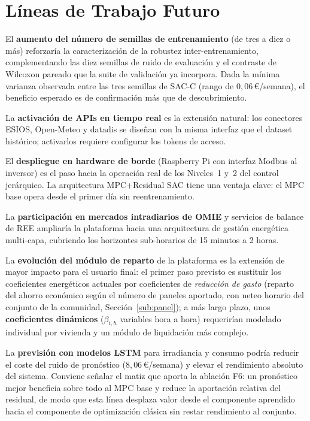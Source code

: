 \documentclass[12pt, a4paper, twoside]{report}
\begin{document}
\chapter{Líneas de Trabajo Futuro}
\label{chap:futuro}

El \textbf{aumento del número de semillas de entrenamiento} (de tres a diez o
más) reforzaría la caracterización de la robustez inter-entrenamiento,
complementando las diez semillas de ruido de evaluación y el contraste de
Wilcoxon pareado que la suite de validación ya incorpora. Dada la mínima
varianza observada entre las tres semillas de SAC-C (rango de
$0{,}06$\,€/semana), el beneficio esperado es de confirmación más que de
descubrimiento.

La \textbf{activación de APIs en tiempo real} es la extensión natural: los
conectores ESIOS, Open-Meteo y datadis se diseñan con la misma interfaz que el
dataset histórico; activarlos requiere configurar los tokens de acceso.

El \textbf{despliegue en hardware de borde} (Raspberry Pi con interfaz Modbus
al inversor) es el paso hacia la operación real de los Niveles~1 y~2 del
control jerárquico. La arquitectura MPC+Residual SAC tiene una ventaja clave:
el MPC base opera desde el primer día sin reentrenamiento.

La \textbf{participación en mercados intradiarios de OMIE} y servicios de
balance de REE ampliaría la plataforma hacia una arquitectura de gestión
energética multi-capa, cubriendo los horizontes sub-horarios de 15 minutos a
2 horas.

La \textbf{evolución del módulo de reparto} de la plataforma es la extensión
de mayor impacto para el usuario final: el primer paso previsto es sustituir
los coeficientes energéticos actuales por coeficientes de \emph{reducción de
gasto} (reparto del ahorro económico según el número de paneles aportado, con
neteo horario del conjunto de la comunidad, Sección~\ref{sub:panel}); a más
largo plazo, unos \textbf{coeficientes dinámicos} ($\beta_{i,h}$ variables
hora a hora) requerirían modelado individual por vivienda y un módulo de
liquidación más complejo.

La \textbf{previsión con modelos LSTM} para irradiancia y consumo podría
reducir el coste del ruido de pronóstico ($8{,}06$\,€/semana) y elevar el
rendimiento absoluto del sistema. Conviene señalar el matiz que aporta la
ablación F6: un pronóstico mejor beneficia sobre todo al MPC base y reduce la
aportación relativa del residual, de modo que esta línea desplaza valor desde
el componente aprendido hacia el componente de optimización clásica sin restar
rendimiento al conjunto.
\end{document}
